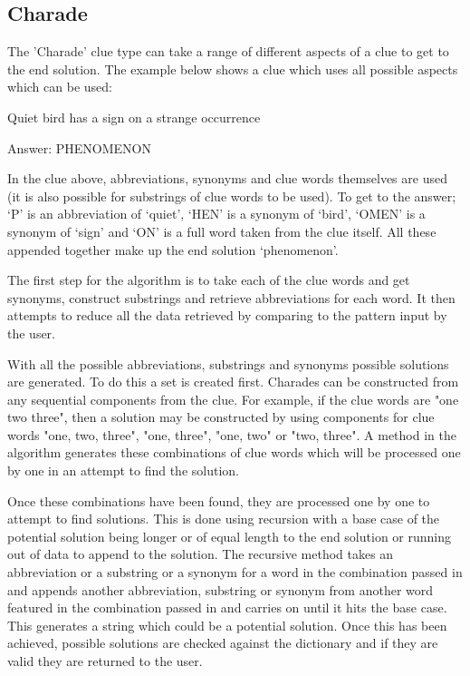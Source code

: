 \subsection{Charade}

The 'Charade' clue type can take a range of different aspects of a clue 
to get to the end solution. The example below shows a clue which uses 
all possible aspects which can be used: 

Quiet bird has a sign on a strange occurrence

Answer: PHENOMENON

In the clue above, abbreviations, synonyms and clue words themselves are 
used (it is also possible for substrings of clue words to be used). To get to 
the answer; `P' is an abbreviation of `quiet', `HEN' is a synonym of `bird', 
`OMEN' is a synonym of `sign' and `ON' is a full word taken from the clue 
itself. All these appended together make up the end solution `phenomenon'.

The first step for the algorithm is to take each of the clue words and get 
synonyms, construct substrings and retrieve abbreviations for each word. 
It then attempts to reduce all the data retrieved by comparing to the pattern 
input by the user.  

With all the possible abbreviations, substrings and synonyms possible 
solutions are generated. To do this a set is created first.
Charades can be constructed from any sequential components from the clue.
 For example, if the clue words are "one two three", then a solution may
 be constructed by using components for clue words "one, two, three",
 "one, three", "one, two" or "two, three". A method in the algorithm 
 generates these combinations of clue words which will be processed 
one by one in an attempt to find the solution.

Once these combinations have been found, they are processed one by one 
to attempt to find solutions. This is done using recursion with a base case of
 the potential solution being longer or of equal length to the end solution or 
running out of data to append to the solution. The recursive method takes 
 an abbreviation or a substring or a synonym for a word in the combination 
passed in and appends another abbreviation, substring or synonym from another 
word featured in the combination passed in and carries on until it hits the base case.
 This generates a string which could be a potential solution. Once this has been 
achieved, possible solutions are checked against the dictionary and if they are 
valid they are returned to the user. 

